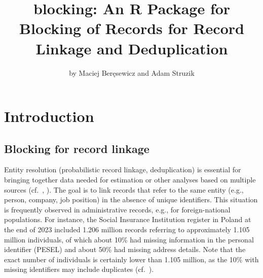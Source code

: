 \title{blocking: An R Package for Blocking of Records for Record Linkage and Deduplication}


\author{by Maciej Beręsewicz and Adam Struzik}

\maketitle


\section{Introduction}\label{introduction}

\subsection{Blocking for record linkage}\label{blocking-for-record-linkage}

Entity resolution (probabilistic record linkage, deduplication) is
essential for bringing together data needed for estimation or other
analyses based on multiple sources (cf.~\citet{fellegi1969theory},
\citet{Binette2022}). The goal is to link records that refer to the same entity
(e.g., person, company, job position) in the absence of unique
identifiers. This situation is frequently observed in administrative
records, e.g., for foreign-national populations. For instance, the
Social Insurance Institution register in Poland at the end of 2023
included 1.206 million records referring to approximately 1.105 million
individuals, of which about 10\% had missing information in the personal
identifier (PESEL) and about 50\% had missing address details. Note that
the exact number of individuals is certainly lower than 1.105 million,
as the 10\% with missing identifiers may include duplicates
(cf.~\citet{beresewicz2025estimation}).

